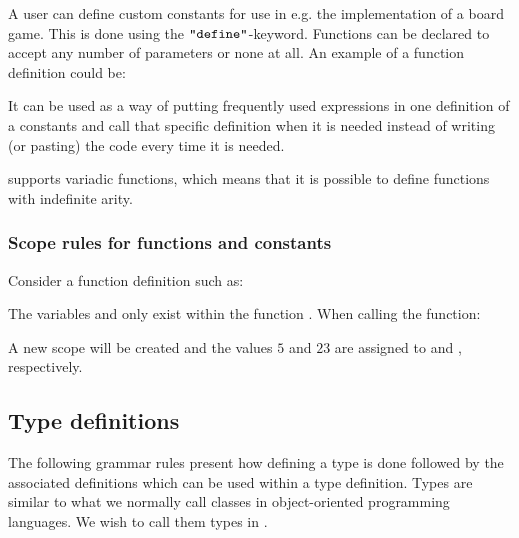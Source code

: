 A user can define custom constants for use in e.g. the implementation of a board game.
This is done using the $\texttt{"define"}$-keyword. Functions can be declared to accept
any number of parameters or none at all. An example of a function definition could
be:


It can be used as a way of putting frequently used expressions in one definition
of a constants and call that specific definition when it is needed instead of
writing (or pasting) the code every time it is needed. 

\productname{} supports variadic functions, which means that it is possible to define
functions with indefinite arity.


\subsubsection{Scope rules for functions and constants}

Consider a function definition such as:


The variables  and  only exist within the function .
When calling the function:


A new scope will be created and the values $5$ and $23$
are assigned to  and , respectively.

\subsection{Type definitions}
\label{sec:typedefinitions}

The following grammar rules present how defining a type is done followed by the
associated definitions which can be used within a type definition. Types are
similar to what we normally call classes in object-oriented programming
languages. We wish to call them types in \productname{}.

\begin{ebnf}
 
\end{ebnf}

